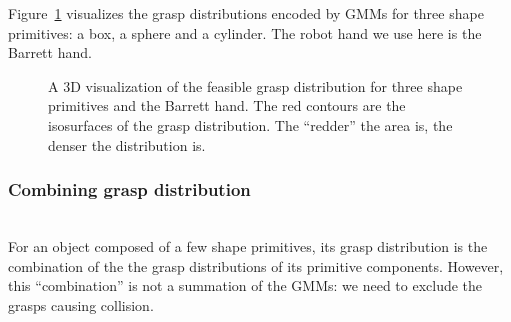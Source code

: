 Figure~\ref{fig:primtivedistr} visualizes the grasp distributions encoded by GMMs for three shape primitives: a box, a sphere and a cylinder. The robot hand we use here is the Barrett hand.

\begin{figure}
  \centering
  \caption{A 3D visualization of the feasible grasp distribution for three shape primitives and the Barrett hand. The red contours are the isosurfaces of the grasp distribution. The ``redder'' the area is, the denser the distribution is.}
  \label{fig:primtivedistr}
\end{figure}


\subsubsection{Combining grasp distribution} ~\\
\label{cha3:sec4:combine:combining}
For an object composed of a few shape primitives, its grasp distribution is the combination of the the grasp distributions of its primitive components. However, this ``combination'' is not a summation of the GMMs: we need to exclude the grasps causing collision.

